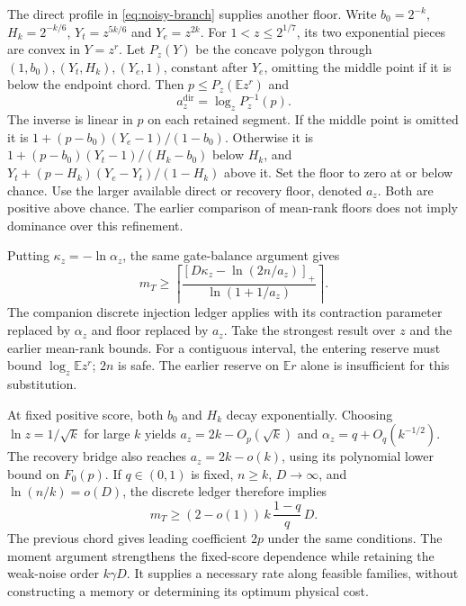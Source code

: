 \documentclass[11pt,a4paper]{article}
\newcommand{\E}{\mathbb E}
\begin{document}
The direct profile in \eqref{eq:noisy-branch} supplies another floor. Write $b_0=2^{-k}$, $H_k=2^{-k/6}$, $Y_t=z^{5k/6}$ and $Y_e=z^{2k}$. For $1<z\le2^{1/7}$, its two exponential pieces are convex in $Y=z^r$. Let $P_z(Y)$ be the concave polygon through $(1,b_0),(Y_t,H_k),(Y_e,1)$, constant after $Y_e$, omitting the middle point if it is below the endpoint chord. Then $p\le P_z(\E z^r)$ and
\[
a_z^{\mathrm{dir}}=\log_z P_z^{-1}(p).
\]
The inverse is linear in $p$ on each retained segment. If the middle point is omitted it is $1+(p-b_0)(Y_e-1)/(1-b_0)$. Otherwise it is $1+(p-b_0)(Y_t-1)/(H_k-b_0)$ below $H_k$, and $Y_t+(p-H_k)(Y_e-Y_t)/(1-H_k)$ above it. Set the floor to zero at or below chance. Use the larger available direct or recovery floor, denoted $a_z$. Both are positive above chance. The earlier comparison of mean-rank floors does not imply dominance over this refinement.

\begin{samepage}
Putting $\kappa_z=-\ln\alpha_z$, the same gate-balance argument gives
\begin{equation}
m_T\ge\left\lceil
\frac{[D\kappa_z-\ln(2n/a_z)]_+}{\ln(1+1/a_z)}
\right\rceil .
\label{eq:noisy-moment-budget}
\end{equation}
The companion discrete injection ledger applies with its contraction parameter replaced by $\alpha_z$ and floor replaced by $a_z$. Take the strongest result over $z$ and the earlier mean-rank bounds. For a contiguous interval, the entering reserve must bound $\log_z\E z^r$; $2n$ is safe. The earlier reserve on $\E r$ alone is insufficient for this substitution.
\end{samepage}

At fixed positive score, both $b_0$ and $H_k$ decay exponentially. Choosing $\ln z=1/\sqrt{k}$ for large $k$ yields $a_z=2k-O_p(\sqrt{k})$ and $\alpha_z=q+O_q(k^{-1/2})$. The recovery bridge also reaches $a_z=2k-o(k)$, using its polynomial lower bound on $F_0(p)$. If $q\in(0,1)$ is fixed, $n\ge k$, $D\to\infty$, and $\ln(n/k)=o(D)$, the discrete ledger therefore implies
\begin{equation}
m_T\ge(2-o(1))\,k\,\frac{1-q}{q}\,D.
\label{eq:noisy-moment-asymptotic}
\end{equation}
The previous chord gives leading coefficient $2p$ under the same conditions. The moment argument strengthens the fixed-score dependence while retaining the weak-noise order $k\gamma D$. It supplies a necessary rate along feasible families, without constructing a memory or determining its optimum physical cost.
\end{document}
